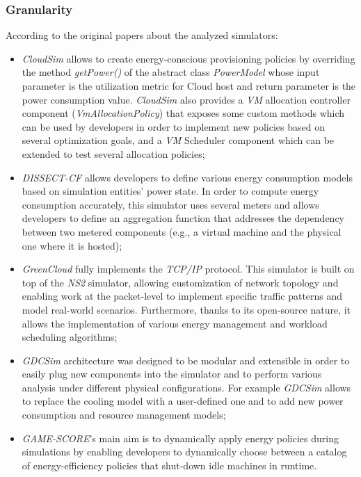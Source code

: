 {\subsubsection{Granularity}
According to the original papers about the analyzed simulators:
\begin{itemize}
\item \emph{CloudSim} allows to create energy-conscious provisioning policies by overriding the method \emph{getPower()} of the abstract class \emph{PowerModel} whose input parameter is the utilization metric for Cloud host and return parameter is the power consumption value. \emph{CloudSim} also provides a \emph{VM} allocation controller component (\emph{VmAllocationPolicy}) that exposes some custom methods which can be used by developers in order to implement new policies based on several optimization goals, and a \emph{VM} Scheduler component which can be extended to test several allocation policies;
\item \emph{DISSECT-CF} allows developers to define various energy consumption models based on simulation entities' power state. In order to compute energy consumption accurately, this simulator uses several meters and allows developers to define an aggregation function that addresses the dependency between two metered components (e.g., a virtual machine and the physical one where it is hosted);
\item \emph{GreenCloud} fully implements the \emph{TCP/IP} protocol. This simulator is built on top of the \emph{NS2} simulator, allowing customization of network topology and enabling work at the packet-level to implement specific traffic patterns and model real-world scenarios. Furthermore, thanks to its open-source nature, it allows the implementation of various energy management and workload scheduling algorithms;
\item \emph{GDCSim} architecture was designed to be modular and extensible in order to easily plug new components into the simulator and to perform various analysis under different physical configurations. For example \emph{GDCSim} allows to replace the cooling model with a user-defined one and to add new power consumption and resource management models;
\item \emph{GAME-SCORE}'s main aim is to dynamically apply energy policies during simulations by enabling developers to dynamically choose between a catalog of energy-efficiency policies that shut-down idle machines in runtime.
\end{itemize}

}
